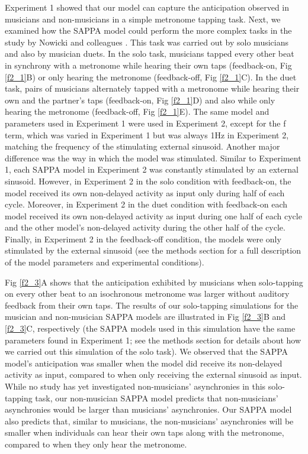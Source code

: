 \documentclass{report}
\begin{document}
Experiment 1 showed that our model can capture the anticipation observed in musicians and non-musicians in a simple metronome tapping task. Next, we examined how the SAPPA model could perform the more complex tasks in the study by Nowicki and colleagues \cite{nowicki2013mutual}. This task was carried out by solo musicians and also by musician duets. In the solo task, musicians tapped every other beat in synchrony with a metronome while hearing their own taps (feedback-on, Fig \ref{f2_1}B) or only hearing the metronome (feedback-off, Fig \ref{f2_1}C). In the duet task, pairs of musicians alternately tapped with a metronome while hearing their own and the partner’s taps (feedback-on, Fig \ref{f2_1}D) and also while only hearing the metronome (feedback-off, Fig \ref{f2_1}E). The same model and parameters used in Experiment 1 were used in Experiment 2, except for the f term, which was varied in Experiment 1 but was always 1Hz in Experiment 2, matching the frequency of the stimulating external sinusoid. Another major difference was the way in which the model was stimulated. Similar to Experiment 1, each SAPPA model in Experiment 2 was constantly stimulated by an external sinusoid. However, in Experiment 2 in the solo condition with feedback-on, the model received its own non-delayed activity as input only during half of each cycle. Moreover, in Experiment 2 in the duet condition with feedback-on each model received its own non-delayed activity as input during one half of each cycle and the other model’s non-delayed activity during the other half of the cycle. Finally, in Experiment 2 in the feedback-off condition, the models were only stimulated by the external sinusoid (see the methods section for a full description of the model parameters and experimental conditions).

Fig \ref{f2_3}A shows that the anticipation exhibited by musicians when solo-tapping on every other beat to an isochronous metronome was larger without auditory feedback from their own taps. The results of our solo-tapping simulations for the musician and non-musician SAPPA models are illustrated in Fig \ref{f2_3}B and \ref{f2_3}C, respectively (the SAPPA models used in this simulation have the same parameters found in Experiment 1; see the methods section for details about how we carried out this simulation of the solo task). We observed that the SAPPA model’s anticipation was smaller when the model did receive its non-delayed activity as input, compared to when only receiving the external sinusoid as input. While no study has yet investigated non-musicians’ asynchronies in this solo-tapping task, our non-musician SAPPA model predicts that non-musicians’ asynchronies would be larger than musicians’ asynchronies. Our SAPPA model also predicts that, similar to musicians, the non-musicians’ asynchronies will be smaller when individuals can hear their own taps along with the metronome, compared to when they only hear the metronome.
\end{document}
